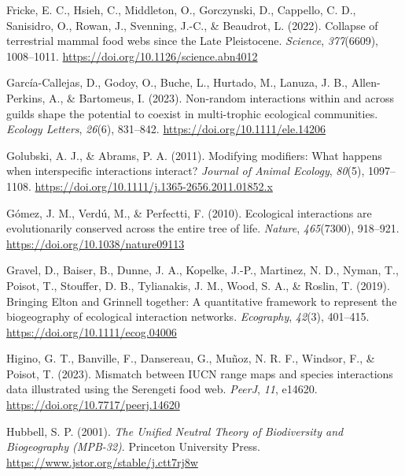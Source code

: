 \documentclass[
]{article}
\newlength{\cslhangindent}
\newenvironment{CSLReferences}[2] %
 {\begin{list}{}{%
  \setlength{\itemindent}{0pt}
  \setlength{\leftmargin}{0pt}
  \setlength{\parsep}{0pt}
  \ifodd #1
   \setlength{\leftmargin}{\cslhangindent}
   \setlength{\itemindent}{-1\cslhangindent}
  \fi
  \setlength{\itemsep}{#2\baselineskip}}}
 {\end{list}}
\begin{document}
\begin{CSLReferences}{1}{0}
Fricke, E. C., Hsieh, C., Middleton, O., Gorczynski, D., Cappello, C.
D., Sanisidro, O., Rowan, J., Svenning, J.-C., \& Beaudrot, L. (2022).
Collapse of terrestrial mammal food webs since the {Late Pleistocene}.
\emph{Science}, \emph{377}(6609), 1008--1011.
\url{https://doi.org/10.1126/science.abn4012}

García-Callejas, D., Godoy, O., Buche, L., Hurtado, M., Lanuza, J. B.,
Allen-Perkins, A., \& Bartomeus, I. (2023). Non-random interactions
within and across guilds shape the potential to coexist in multi-trophic
ecological communities. \emph{Ecology Letters}, \emph{26}(6), 831--842.
\url{https://doi.org/10.1111/ele.14206}

Golubski, A. J., \& Abrams, P. A. (2011). Modifying modifiers: What
happens when interspecific interactions interact? \emph{Journal of
Animal Ecology}, \emph{80}(5), 1097--1108.
\url{https://doi.org/10.1111/j.1365-2656.2011.01852.x}

Gómez, J. M., Verdú, M., \& Perfectti, F. (2010). Ecological
interactions are evolutionarily conserved across the entire tree of
life. \emph{Nature}, \emph{465}(7300), 918--921.
\url{https://doi.org/10.1038/nature09113}

Gravel, D., Baiser, B., Dunne, J. A., Kopelke, J.-P., Martinez, N. D.,
Nyman, T., Poisot, T., Stouffer, D. B., Tylianakis, J. M., Wood, S. A.,
\& Roslin, T. (2019). Bringing {Elton} and {Grinnell} together: A
quantitative framework to represent the biogeography of ecological
interaction networks. \emph{Ecography}, \emph{42}(3), 401--415.
\url{https://doi.org/10.1111/ecog.04006}

Higino, G. T., Banville, F., Dansereau, G., Muñoz, N. R. F., Windsor,
F., \& Poisot, T. (2023). Mismatch between {IUCN} range maps and species
interactions data illustrated using the {Serengeti} food web.
\emph{PeerJ}, \emph{11}, e14620.
\url{https://doi.org/10.7717/peerj.14620}

Hubbell, S. P. (2001). \emph{The {Unified Neutral Theory} of
{Biodiversity} and {Biogeography} ({MPB-32})}. Princeton University
Press. \url{https://www.jstor.org/stable/j.ctt7rj8w}


\end{CSLReferences}
\end{document}

